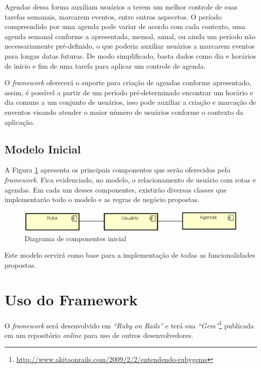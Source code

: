 Agendas dessa forma auxiliam usuários a terem um melhor controle de suas tarefas semanais, marcarem eventos, entre outros aspecetos. O período compreendido por uma agenda pode variar de acordo com cada contexto, uma agenda semanal conforme a apresentada, mensal, anual, ou ainda um período não necessariamente pré-definido, o que poderia auxiliar usuários a marcarem eventos para longas datas futuras. De modo simplificado, basta dados como dia e horários de início e fim de uma tarefa para aplicar um controle de agenda.

O \textit{framework} oferecerá o suporte para criação de agendas conforme apresentado, assim, é possível a partir de um período pré-determinado encontrar um horário e dia comuns a um conjunto de usuários, isso pode auxiliar a criação e marcação de enventos visando atender o maior número de usuários conforme o contexto da aplicação.

\subsection{Modelo Inicial}

A Figura \ref{diagrama de componentes} apresenta os principais componentes que serão oferecidos pelo \textit{framework}. Fica evidenciado, no modelo, o relacionamento de usuário com rotas e agendas. Em cada um desses componentes, existirão diversas classes que implementarão todo o modelo e as regras de negócio propostas.

\begin{figure}[!h]
	\centering
	\includegraphics[scale=0.55]{figuras/capitulo5/diagrama_componentes.eps}
	\caption{Diagrama de componentes inicial}
	\label{diagrama de componentes}
\end{figure}

Este modelo servirá como base para a implementação de todas as funcionalidades propostas.

\section{Uso do Framework}

O \textit{framework} será desenvolvido em \textit{``Ruby on Rails''} e terá sua \textit{``Gem''}\footnote{\url{http://www.akitaonrails.com/2009/2/2/entendendo-rubygems}} publicada em um repositório \textit{online} para uso de outros desenvolvedores.

